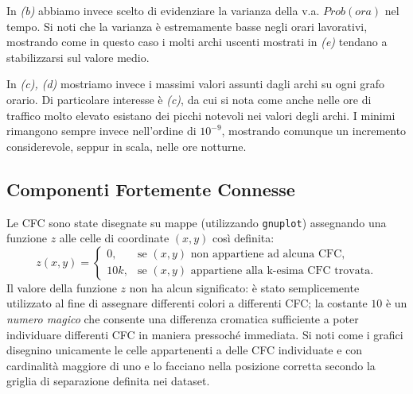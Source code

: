 \documentclass[10pt,a4paper]{article}
\begin{document}
In \emph{(b)} abbiamo invece scelto di evidenziare la varianza della v.a. $Prob(ora)$ nel tempo. Si noti che la varianza è estremamente basse negli orari lavorativi, mostrando come in questo caso i molti archi uscenti mostrati in \emph{(e)} tendano a stabilizzarsi sul valore medio.

In \emph{(c), (d)} mostriamo invece i massimi valori assunti dagli archi su ogni grafo orario. Di particolare interesse è \emph{(c)}, da cui si nota come anche nelle ore di traffico molto elevato esistano dei picchi notevoli nei valori degli archi. I minimi rimangono sempre invece nell'ordine di $10^{-9}$, mostrando comunque un incremento considerevole, seppur in scala, nelle ore notturne.
 
\subsection{Componenti Fortemente Connesse}

Le CFC sono state disegnate su mappe (utilizzando \verb!gnuplot!) assegnando una funzione $z$ alle celle di
coordinate $(x,y)$ così definita:
$$
z(x,y) =
\begin{cases}
0, & \text{se $(x,y)$ non appartiene ad alcuna CFC,} \\
10k, & \text{se $(x,y)$ appartiene alla k-esima CFC trovata.}
\end{cases}
$$
Il valore della funzione $z$ non ha alcun significato: è stato semplicemente utilizzato al fine di assegnare differenti colori a differenti CFC; la costante $10$ è un \emph{numero magico} che consente una differenza cromatica sufficiente a poter individuare differenti CFC in maniera pressoché immediata. Si noti come i grafici disegnino unicamente le celle appartenenti a delle CFC individuate e con cardinalità maggiore di uno e lo facciano nella posizione corretta secondo la griglia di separazione definita nei dataset.
\end{document}
